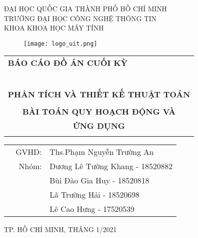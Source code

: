 \documentclass[a4paper]{article}
\begin{document}
\begin{titlepage}
\begin{center}
ĐẠI HỌC QUỐC GIA THÀNH PHỐ HỒ CHÍ MINH \\
TRƯỜNG ĐẠI HỌC CÔNG NGHỆ THÔNG TIN \\
KHOA KHOA HỌC MÁY TÍNH 
\end{center}

\vspace{1cm}

\begin{figure}[h!]
\begin{center}
\texttt{[image: logo\_uit.png]}
\end{center}
\end{figure}

\vspace{1cm}


\begin{center}
\begin{tabular}{c}
	\multicolumn{1}{l}{\textsc{\bf {\Large  BÁO CÁO ĐỒ ÁN CUỐI KỲ}}}\\
	~~\\
	\hline
	\\
	\multicolumn{1}{l}{\textbf{{\Large PHÂN TÍCH VÀ THIẾT KẾ THUẬT TOÁN}}}\\
	\\
	
	\textbf{{\Huge BÀI TOÁN QUY HOẠCH ĐỘNG VÀ}}\\
	\textbf{{\Huge ỨNG DỤNG}}\\
	
	\\
	\hline
\end{tabular}
\end{center}

\vspace{3cm}

\begin{table}[h]
\begin{tabular}{rrl}
\hspace{5 cm} & GVHD: &Ths.Phạm Nguyễn Trường An
\\
& Nhóm: & Dương Lê Tường Khang - 18520882
\\
& & Bùi Đào Gia Huy - 18520818 
\\
& & Lã Trường Hải - 18520698
\\
& & Lê Cao Hưng - 17520539
\end{tabular}
\end{table}

\begin{center}
{\footnotesize TP. HỒ CHÍ MINH, THÁNG 1/2021}
\end{center}
\end{titlepage}
\end{document}
